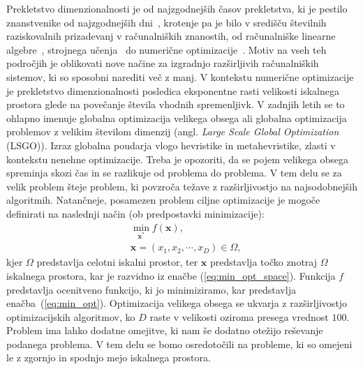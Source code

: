 Prekletstvo dimenzionalnosti je od najzgodnejših časov prekletstva, ki je pestilo znanstvenike od najzgodnejših dni~\cite{bib:curse_of_dim}, krotenje pa je bilo v središču številnih raziskovalnih prizadevanj v računalniških znanostih, od računalniške linearne algebre~\cite{bib:COD:linear_algebra}, strojnega učenja~\cite{bib:COD:machine_learning} do numerične optimizacije~\cite{bib:COD:numerical_methods}.
Motiv na vseh teh področjih je oblikovati nove načine za izgradnjo razširljivih računalniških sistemov, ki so sposobni narediti več z manj.
V kontekstu numerične optimizacije je prekletstvo dimenzionalnosti posledica eksponentne rasti velikosti iskalnega prostora glede na povečanje števila vhodnih spremenljivk.
V zadnjih letih se to ohlapno imenuje globalna optimizacija velikega obsega ali globalna optimizacija problemov z velikim številom dimenzij (angl. \textit{Large Scale Global Optimization} (LSGO)).
Izraz globalna poudarja vlogo hevristike in metahevristike, zlasti v kontekstu nenehne optimizacije.
Treba je opozoriti, da se pojem velikega obsega spreminja skozi čas in se razlikuje od problema do problema.
V tem delu se za velik problem šteje problem, ki povzroča težave z razširljivostjo na najsodobnejših algoritmih.
Natančneje, posamezen problem ciljne optimizacije je mogoče definirati na naslednji način (ob predpostavki minimizacije):
\begin{align}
	&\min_{\mathbf{x}^*}{f(\mathbf{x})}, \label{eq:min_opt}\\
	&\mathbf{x} = (x_1, x_2, \cdots, x_D) \in \Omega \label{eq:min_opt_space},
\end{align}
kjer $\Omega$ predstavlja celotni iskalni prostor, ter $\mathbf{x}$ predstavlja točko znotraj $\Omega$ iskalnega prostora, kar je razvidno iz enačbe (\ref{eq:min_opt_space}).
Funkcija $f$ predstavlja ocenitveno funkcijo, ki jo minimiziramo, kar predstavlja enačba~(\ref{eq:min_opt}).
Optimizacija velikega obsega se ukvarja z razširljivostjo optimizacijskih algoritmov, ko $D$ raste v velikosti oziroma presega vrednost $100$.
Problem ima lahko dodatne omejitve, ki nam še dodatno otežijo reševanje podanega problema.
V tem delu se bomo osredotočili na probleme, ki so omejeni le z zgornjo in spodnjo mejo iskalnega prostora.

